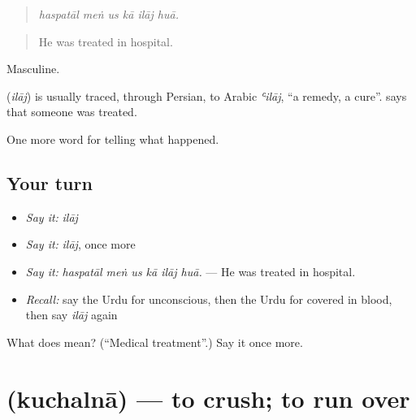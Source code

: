 \begin{quote}
     
\end{quote}

\begin{quote}
\emph{haspatāl meṅ us kā ilāj huā.}
\end{quote}

\begin{quote}
He was treated in hospital.
\end{quote}

Masculine.

\begin{cousinweb}
\textbf{} (\emph{ilāj}) is usually traced, through Persian, to Arabic \emph{ʿilāj}, \textquotedblleft{}a remedy, a cure\textquotedblright{}. \textbf{ } says that someone was treated.
\end{cousinweb}

\begin{grammarlens}[title={What you've built}]
One more word for telling what happened.
\end{grammarlens}

\subsection*{Your turn}
\begin{itemize}
\raggedright
  \item \emph{Say it:} \emph{ilāj}
  \item \emph{Say it:} \emph{ilāj}, once more
  \item \emph{Say it:} \emph{haspatāl meṅ us kā ilāj huā.} — He was treated in hospital.
  \item \emph{Recall:} say the Urdu for unconscious, then the Urdu for covered in blood, then say \emph{ilāj} again
\end{itemize}

\begin{tcolorbox}[breakable,colback=teal!4,colframe=teal!35!black,title={Before you move on}]
What does  mean? (\textquotedblleft{}Medical treatment\textquotedblright{}.) Say it once more.
\end{tcolorbox}
\section[\texorpdfstring{\ur{کچلنا} (kuchalnā)}{کچلنا (kuchalnā)}]{ (kuchalnā) — to crush; to run over}

